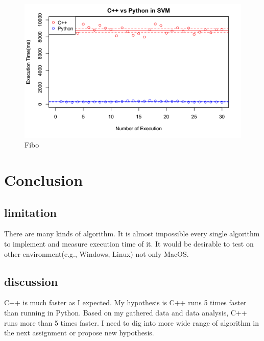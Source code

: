 \documentclass[11pt, a4paper]{article}
\begin{document}
\begin{figure}[htbp]
\centering
\includegraphics[clip, width=200mm]{000017.png}
\caption{Fibo}
\end{figure}

\section{Conclusion}
\subsection{limitation}
There are many kinds of algorithm. It is almost impossible every single algorithm to implement and measure execution time of it. It would be desirable to test on other environment(e.g., Windows, Linux) not only MacOS. 
\subsection{discussion}
C++ is much faster as I expected. My hypothesis is C++ runs 5 times faster than running in Python. Based on my gathered data and data analysis, C++ runs more than 5 times faster. I need to dig into more wide range of algorithm in the next assignment or propose new hypothesis.
\end{document}

